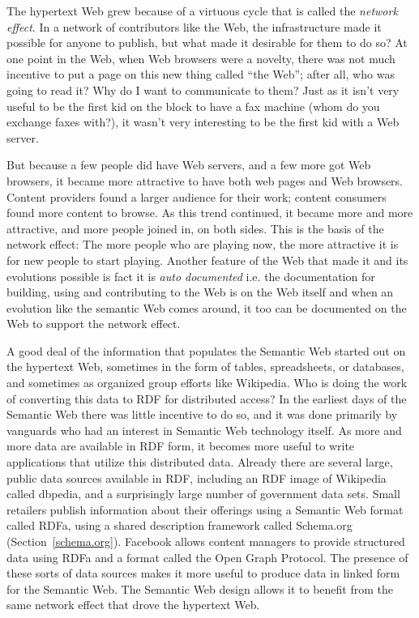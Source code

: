 The hypertext Web grew because of a virtuous cycle that is called the
\emph{network effect}. In a network of contributors like the Web, the
infrastructure made it possible for anyone to publish, but what made it
desirable for them to do so? At one point in the Web, when Web browsers
were a novelty, there was not much incentive to put a page on this new
thing called ``the Web''; after all, who was going to read it? Why do I
want to communicate to them? Just as it isn't very useful to be the
first kid on the block to have a fax machine (whom do you exchange faxes
with?), it wasn't very interesting to be the first kid with a Web
server.

But because a few people did have Web servers, and a few more got Web
browsers, it became more attractive to have both web pages and Web
browsers. Content providers found a larger audience for their work;
content consumers found more content to browse. As this trend continued,
it became more and more attractive, and more people joined in, on both
sides. This is the basis of the network effect: The more people who are
playing now, the more attractive it is for new people to start playing.
Another feature of the Web that made it and its evolutions possible is
fact it is \emph{auto documented} i.e. the documentation for building,
using and contributing to the Web is on the Web itself and when an
evolution like the semantic Web comes around, it too can be documented
on the Web to support the network effect.

A good deal of the information that populates the Semantic Web started
out on the hypertext Web, sometimes in the form of tables, spreadsheets,
or databases, and sometimes as organized group efforts like Wikipedia.
Who is doing the work of converting this data to RDF for distributed
access? In the earliest days of the Semantic Web there was little
incentive to do so, and it was done primarily by vanguards who had an
interest in Semantic Web technology itself. As more and more data are
available in RDF form, it becomes more useful to write applications that
utilize this distributed data. Already there are several large, public
data sources available in RDF, including an RDF image of Wikipedia
called dbpedia, and a surprisingly large number of government data sets.
Small retailers publish information about their offerings using a
Semantic Web format called RDFa, using a shared description framework called Schema.org (Section~\ref{schema.org}). 
Facebook allows content managers to
provide structured data using RDFa and a format called the Open Graph
Protocol. The presence of these sorts of data sources makes it more
useful to produce data in linked form for the Semantic Web. The Semantic
Web design allows it to benefit from the same network effect that drove
the hypertext Web.

